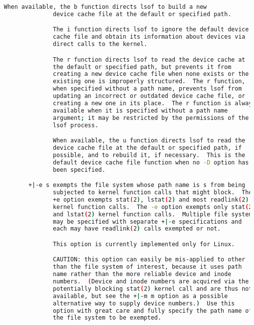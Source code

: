 {{\begin{lstlisting}[language=bash]
              When available, the b function directs lsof to build a new
              device cache file at the default or specified path.

              The i function directs lsof to ignore the default device
              cache file and obtain its information about devices via
              direct calls to the kernel.

              The r function directs lsof to read the device cache at
              the default or specified path, but prevents it from
              creating a new device cache file when none exists or the
              existing one is improperly structured.  The r function,
              when specified without a path name, prevents lsof from
              updating an incorrect or outdated device cache file, or
              creating a new one in its place.  The r function is always
              available when it is specified without a path name
              argument; it may be restricted by the permissions of the
              lsof process.

              When available, the u function directs lsof to read the
              device cache file at the default or specified path, if
              possible, and to rebuild it, if necessary.  This is the
              default device cache file function when no -D option has
              been specified.

       +|-e s exempts the file system whose path name is s from being
              subjected to kernel function calls that might block.  The
              +e option exempts stat(2), lstat(2) and most readlink(2)
              kernel function calls.  The -e option exempts only stat(2)
              and lstat(2) kernel function calls.  Multiple file systems
              may be specified with separate +|-e specifications and
              each may have readlink(2) calls exempted or not.

              This option is currently implemented only for Linux.

              CAUTION: this option can easily be mis-applied to other
              than the file system of interest, because it uses path
              name rather than the more reliable device and inode
              numbers.  (Device and inode numbers are acquired via the
              potentially blocking stat(2) kernel call and are thus not
              available, but see the +|-m m option as a possible
              alternative way to supply device numbers.)  Use this
              option with great care and fully specify the path name of
              the file system to be exempted.


\end{lstlisting}}}
